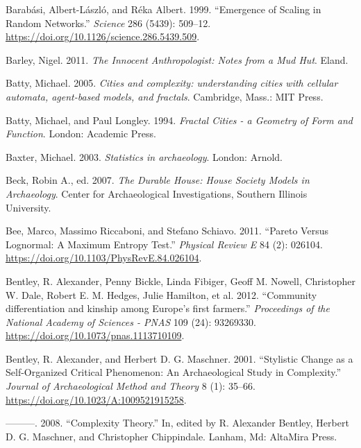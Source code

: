 \documentclass[
  12pt,
  a4paper, twoside]{book}
\newlength{\cslhangindent}
\newlength{\cslentryspacingunit} %
\newenvironment{CSLReferences}[2] %
 {%
  \setlength{\parindent}{0pt}
  \ifodd #1
  \let\oldpar\par
  \def\par{\hangindent=\cslhangindent\oldpar}
  \fi
  \setlength{\parskip}{#2\cslentryspacingunit}
 }%
 {}
\begin{document}
\begin{CSLReferences}{1}{0}
\leavevmode{}%
Barabási, Albert-László, and Réka Albert. 1999. {``Emergence of Scaling in Random Networks.''} \emph{Science} 286 (5439): 509--12. \url{https://doi.org/10.1126/science.286.5439.509}.

\leavevmode{}%
Barley, Nigel. 2011. \emph{The Innocent Anthropologist: Notes from a Mud Hut}. Eland.

\leavevmode{}%
Batty, Michael. 2005. \emph{Cities and complexity: understanding cities with cellular automata, agent-based models, and fractals}. Cambridge, Mass.: MIT Press.

\leavevmode{}%
Batty, Michael, and Paul Longley. 1994. \emph{Fractal Cities - a Geometry of Form and Function}. London: Academic Press.

\leavevmode{}%
Baxter, Michael. 2003. \emph{Statistics in archaeology}. London: Arnold.

\leavevmode{}%
Beck, Robin A., ed. 2007. \emph{The Durable House: House Society Models in Archaeology}. Center for Archaeological Investigations, Southern Illinois University.

\leavevmode{}%
Bee, Marco, Massimo Riccaboni, and Stefano Schiavo. 2011. {``Pareto Versus Lognormal: A Maximum Entropy Test.''} \emph{Physical Review E} 84 (2): 026104. \url{https://doi.org/10.1103/PhysRevE.84.026104}.

\leavevmode{}%
Bentley, R. Alexander, Penny Bickle, Linda Fibiger, Geoff M. Nowell, Christopher W. Dale, Robert E. M. Hedges, Julie Hamilton, et al. 2012. {``Community differentiation and kinship among Europe{'}s first farmers.''} \emph{Proceedings of the National Academy of Sciences - PNAS} 109 (24): 93269330. \url{https://doi.org/10.1073/pnas.1113710109}.

\leavevmode{}%
Bentley, R. Alexander, and Herbert D. G. Maschner. 2001. {``Stylistic {Change} as a {Self-Organized Critical Phenomenon}: {An Archaeological Study} in {Complexity}.''} \emph{Journal of Archaeological Method and Theory} 8 (1): 35--66. \url{https://doi.org/10.1023/A:1009521915258}.

\leavevmode{}%
---------. 2008. {``Complexity Theory.''} In, edited by R. Alexander Bentley, Herbert D. G. Maschner, and Christopher Chippindale. Lanham, Md: AltaMira Press.


\end{CSLReferences}
\end{document}
